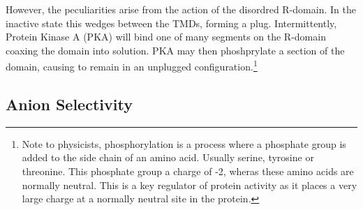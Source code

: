 However, the peculiarities arise from the action of the disordred R-domain. In the inactive state this wedges between the TMDs, forming a plug. Intermittently, Protein Kinase A (PKA) will bind one of many segments on the R-domain coaxing the domain into solution. PKA may then phoshprylate a section of the domain, causing to remain in an unplugged configuration.\footnote{Note to physicists, phosphorylation is a process where a phosphate group is added to the side chain of an amino acid. Usually serine, tyrosine or threonine. This phosphate group a charge of -2, wheras these amino acids are normally neutral. This is a key regulator of protein activity as it places a very large charge at a normally neutral site in the protein.}

\subsection {Anion Selectivity}

